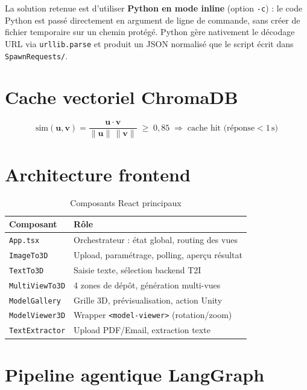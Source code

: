 \documentclass[12pt,a4paper,oneside]{report}
\newcommand{\theadrow}{\rowcolor{tekupblue!12}}
\begin{document}
La solution retenue est d'utiliser \textbf{Python en mode inline}
(option \texttt{-c}) : le code Python est passé directement en
argument de ligne de commande, sans créer de fichier temporaire sur
un chemin protégé. Python gère nativement le décodage URL via
\texttt{urllib.parse} et produit un JSON normalisé que le script
écrit dans \texttt{SpawnRequests/}.

\section{Cache vectoriel ChromaDB}

\begin{equation}
\text{sim}(\mathbf{u},\mathbf{v}) =
\frac{\mathbf{u}\cdot\mathbf{v}}{\|\mathbf{u}\|\,\|\mathbf{v}\|}
\;\geq\; 0{,}85 \;\Rightarrow\; \text{cache hit (réponse}< 1\,\text{s)}
\label{eq:cosine}
\end{equation}

\section{Architecture frontend}

\begin{table}[H]
\centering
\caption{Composants React principaux}
\label{tab:components}
\begin{tabularx}{\linewidth}{@{}lX@{}}
\toprule
\theadrow
\textbf{Composant} & \textbf{Rôle} \\\midrule
\texttt{App.tsx}       & Orchestrateur : état global, routing des vues \\
\texttt{ImageTo3D}     & Upload, paramétrage, polling, aperçu résultat \\
\texttt{TextTo3D}      & Saisie texte, sélection backend T2I \\
\texttt{MultiViewTo3D} & 4 zones de dépôt, génération multi-vues \\
\texttt{ModelGallery}  & Grille 3D, prévisualisation, action Unity \\
\texttt{ModelViewer3D} & Wrapper \texttt{<model-viewer>} (rotation/zoom) \\
\texttt{TextExtractor} & Upload PDF/Email, extraction texte \\
\bottomrule
\end{tabularx}
\end{table}


\section{Pipeline agentique LangGraph}
\label{sec:langgraph}
\end{document}
